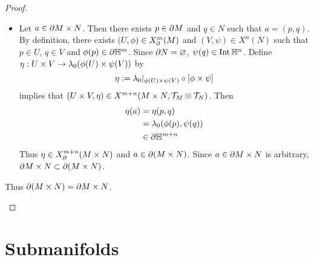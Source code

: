 \documentclass{book}
\begin{document}
\begin{proof}
\begin{enumerate}
\begin{itemize}
	 		\item Let $a \in \partial M \times N$. Then there exists $p \in \partial M$ and $q \in N$ such that $a = (p,q)$. By definition, there exists $(U, \phi) \in X^m_{\partial}(M)$ and $(V, \psi) \in X^n(N)$ such that $p \in U$, $q \in V$ and $\phi(p) \in \partial \mathbb{H}^m$. Since $\partial N = \varnothing$, $\psi(q) \in \operatorname{Int} \mathbb{H}^n$. Define $\eta: U \times V \rightarrow \lambda_0(\phi(U) \times \psi(V))$ by 
	 		$$\eta \vcentcolon= \lambda_0|_{\phi(U) \times \psi(V)} \circ [\phi \times \psi]$$ 
	 		 implies that $(U \times V, \eta) \in X^{m+n}(M \times N , \mathcal{T}_M \otimes \mathcal{T}_N)$. Then
	 		\begin{align*}
	 			\eta(a)
	 			& = \eta(p,q) \\
	 			& = \lambda_0(\phi(p), \psi(q)) \\
	 			& \in \partial \mathbb{H}^{m+n}
	 		\end{align*} 
	 		Thus $\eta \in X^{m+n}_{\partial}(M \times N)$ and $a \in \partial (M \times N)$. Since $a \in \partial M \times N$ is arbitrary, $\partial M \times N \subset \partial (M \times N)$. 
	 	\end{itemize}
 		Thus $\partial (M \times N) = \partial M \times N$. 
	 \end{enumerate}
\end{proof}















































\newpage
\section{Submanifolds}

\begin{defn}
\end{defn}
\end{document}
